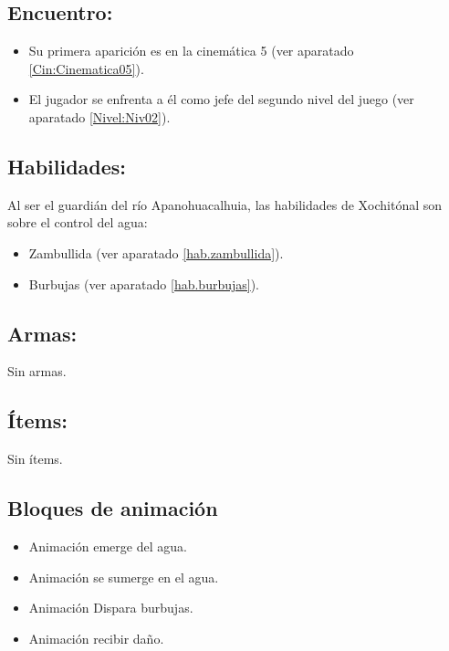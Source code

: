 \subsection{Encuentro:}
\begin{itemize}
	\item Su primera aparición es en la cinemática 5 (ver aparatado \ref{Cin:Cinematica05}). 
	\item El jugador se enfrenta a él como jefe del segundo nivel del juego (ver aparatado \ref{Nivel:Niv02}).
\end{itemize}
\subsection{Habilidades:}
Al ser el guardián del río  Apanohuacalhuia, las habilidades de Xochitónal son sobre el control del agua:
\begin{itemize}
	\item Zambullida (ver aparatado \ref{hab.zambullida}).  
	\item Burbujas (ver aparatado \ref{hab.burbujas}).
\end{itemize}
\subsection{Armas:}
Sin armas.
\subsection{Ítems:}
Sin ítems.
\subsection{Bloques de animación}
	\begin{itemize}
		\item Animación emerge del agua.
		\item Animación se sumerge en el agua.
		\item Animación Dispara burbujas.  
		\item Animación recibir daño.
	\end{itemize}